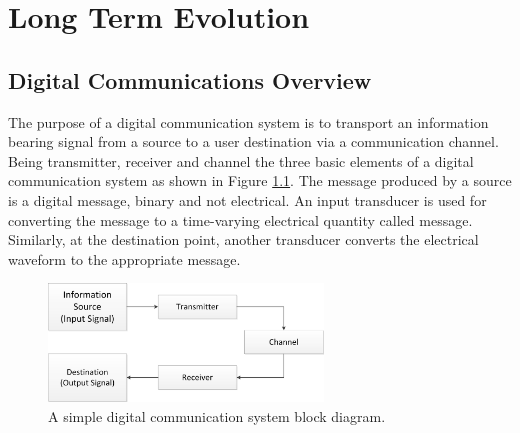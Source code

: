 \chapter{Long Term Evolution}
\label{chap:lte}

\section{Digital Communications Overview}
\label{lte:digicomm}

The purpose of a digital communication system is to transport an information
bearing signal from a source to a user destination via a communication channel.
Being transmitter, receiver and channel the three basic elements of a digital
communication system as shown in Figure \ref{fig:digicomsimple}. The message
produced by a source is a digital message, binary and not electrical. An input
transducer is used for converting the message to a time-varying electrical
quantity called message. Similarly, at the destination point, another transducer
converts the electrical waveform to the appropriate message.


\begin{figure}[htbp]
    \centering
    \includegraphics[width=0.65\textwidth]{./figures/digicom_simple}
    \caption{ A simple digital communication system block diagram.
    \label{fig:digicomsimple}}
\end{figure}


